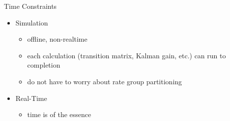 \begin{frame}
Time Constraints
 \begin{itemize}
 \item Simulation
 \begin{itemize}
 \item offline, non-realtime
 \item each calculation (transition matrix, Kalman gain, etc.) can run to completion
 \item do not have to worry about rate group partitioning
 \end{itemize}
  \item Real-Time
  \begin{itemize}
  	\item time is of the essence
  \end{itemize}

\end{itemize}
\end{frame}
